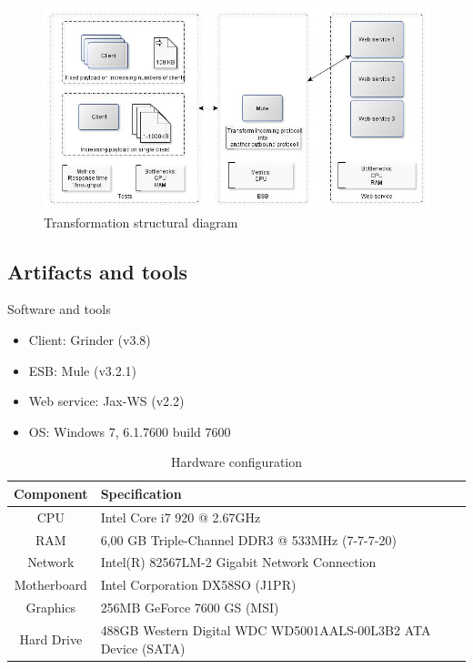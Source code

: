 \begin{figure}[H]
	\centerline{\includegraphics[scale=0.43]{img/transformation}}
	\caption{Transformation structural diagram}
	\label{fig:transform-diagram}
\end{figure}

\newpage
\subsection{Artifacts and tools}
\begin{table}[H]
	\caption{Software and tools}
	\label{table:sw-spec}
	\begin{itemize}
		\item Client: Grinder (v3.8) \cite{whatisgrinder}
		\item ESB: Mule (v3.2.1) \cite{whatismule}
		\item Web service: Jax-WS (v2.2) \cite{whatisjaxws}
		\item OS: Windows 7, 6.1.7600 build 7600
	\end{itemize}
\end{table}

\begin{table}[H]
	\caption{Hardware configuration}
	\label{table:hw-spec}
	\begin{tabular}{c l}
		Component & Specification \\ 
		\hline
		CPU & Intel Core i7 920 @ 2.67GHz  \\
		RAM &  6,00 GB Triple-Channel DDR3 @ 533MHz (7-7-7-20) \\
		Network &  Intel(R) 82567LM-2 Gigabit Network Connection \\
		Motherboard &  Intel Corporation DX58SO (J1PR) \\
		Graphics &  256MB GeForce 7600 GS (MSI) \\
		Hard Drive &  488GB Western Digital WDC WD5001AALS-00L3B2 ATA Device (SATA) \\
		\hline
	\end{tabular} 
\end{table}

